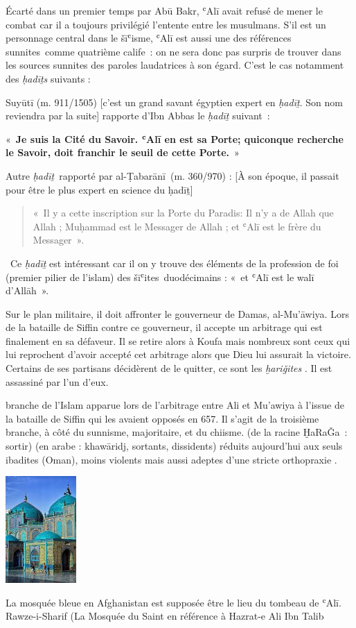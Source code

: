 Écarté dans un premier temps par Abū Bakr, ʿAlī avait refusé de mener le
combat car il a toujours privilégié l'entente entre les musulmans. S'il
est un personnage central dans le šīʿisme, ʿAlī est aussi une des
références sunnites~comme quatrième calife~: on ne sera donc pas surpris
de trouver dans les sources sunnites des paroles laudatrices à son
égard. C'est le cas notamment des \emph{ḥadīṯs} suivants :

Suyūtī (m. 911/1505) {[}c'est un grand savant égyptien expert en
\emph{ḥadīṯ}. Son nom reviendra par la suite{]} rapporte d'Ibn Abbas le
\emph{ḥadīṯ} suivant~:

«~\textbf{Je suis la Cité du Savoir. ʿAlī en est sa Porte; quiconque
recherche le Savoir, doit franchir le seuil de cette Porte.}~»

Autre \emph{ḥadīṯ}~rapporté par al-Ṭabarānī~(m. 360/970) : {[}À son
époque, il passait pour être le plus expert en science du ḥadīṯ{]}
\begin{quote}
«~{Il y a cette inscription sur la Porte du Paradis: Il n'y a de
Allah que Allah ; Muḥammad est le Messager de Allah ; et ʿAlī est le
frère du Messager}~».~
\end{quote}


~Ce \emph{ḥadīṯ} est intéressant car il on y trouve des éléments de la
profession de foi (premier pilier de l'islam) des šīʿites~duodécimains :
«~et ʿAlī est le walī d'Allāh~».

Sur le plan militaire, il doit affronter le gouverneur de Damas,
al-Mu'āwiya. Lors de la bataille de Siffin contre ce gouverneur, il
accepte un arbitrage qui est finalement en sa défaveur. Il se retire
alors à Koufa mais nombreux sont ceux qui lui reprochent d'avoir accepté
cet arbitrage alors que Dieu lui assurait la victoire. Certains de ses
partisans décidèrent de le quitter, ce sont les \emph{ḫariǧites} . Il est assassiné par l'un d'eux.

\begin{Def}
 branche de l'Islam apparue lors de l'arbitrage entre Ali et Mu'awiya à l'issue de la bataille de Siffin qui les avaient opposés en 657. Il s'agit de la troisième branche, à côté du sunnisme, majoritaire, et du chiisme. (de la
racine ḪaRaǦa~: sortir) (en arabe : khawāridj, sortants, dissidents) réduits aujourd'hui aux seuls ibadites (Oman), moins violents mais aussi adeptes d'une stricte orthopraxie .
\end{Def}

\begin{marginfigure}
    \includegraphics[width=1.06615in,height=1.6045in]{Images/image037.jpg}
    \caption{La mosquée bleue en Afghanistan est supposée être le lieu
du tombeau de ʿAlī. Rawze-i-Sharif (La Mosquée du Saint en référence à
Hazrat-e Ali Ibn Talib}
\end{marginfigure}


